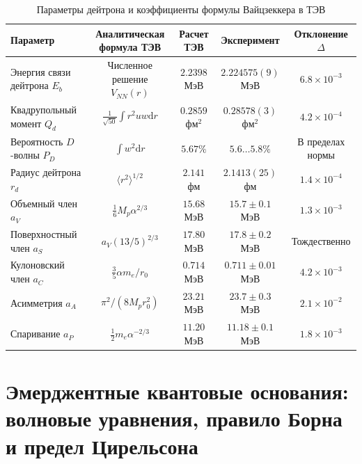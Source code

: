 \documentclass[12pt,a4paper]{article}
\theoremstyle{definition}
\theoremstyle{remark}
\begin{document}
\begin{table}[h!]
	\centering
	\small
	\caption{Параметры дейтрона и коэффициенты формулы Вайцзеккера в ТЭВ}
	\label{tab:nuclear}
	\vspace{2mm}
	\begin{tabular}{lcccc}
		\toprule
		\textbf{Параметр} & \textbf{Аналитическая формула ТЭВ} & \textbf{Расчет ТЭВ} & \textbf{Эксперимент} & \textbf{Отклонение $\Delta$} \\
		\midrule
		Энергия связи дейтрона $E_b$ & Численное решение $V_{NN}(r)$     & $2.2398$ МэВ        & $2.224575(9)$ МэВ    & $6.8 \times 10^{-3}$ \\
		Квадрупольный момент $Q_d$   & $\frac{1}{\sqrt{50}}\int r^2 u w \mathrm{d}r$ & $0.2859$ фм$^2$ & $0.28578(3)$ фм$^2$ & $4.2 \times 10^{-4}$ \\
		Вероятность $D$-волны $P_D$  & $\int w^2 \mathrm{d}r$             & $5.67\%$            & $5.6\dots 5.8\%$     & В пределах нормы \\
		Радиус дейтрона $r_d$        & $\langle r^2 \rangle^{1/2}$        & $2.141$ фм          & $2.1413(25)$ фм      & $1.4 \times 10^{-4}$ \\
		\midrule
		Объемный член $a_V$          & $\frac{1}{6} M_p \alpha^{2/3}$     & $15.68$ МэВ         & $15.7 \pm 0.1$ МэВ   & $1.3 \times 10^{-3}$ \\
		Поверхностный член $a_S$     & $a_V (13/5)^{2/3}$                 & $17.80$ МэВ         & $17.8 \pm 0.2$ МэВ   & Тождественно \\
		Кулоновский член $a_C$       & $\frac{3}{5}\alpha m_e / r_0$      & $0.714$ МэВ         & $0.711 \pm 0.01$ МэВ & $4.2 \times 10^{-3}$ \\
		Асимметрия $a_A$             & $\pi^2 / (8 M_p r_0^2)$            & $23.21$ МэВ         & $23.7 \pm 0.3$ МэВ   & $2.1 \times 10^{-2}$ \\
		Спаривание $a_P$             & $\frac{1}{2} m_e \alpha^{-2/3}$    & $11.20$ МэВ         & $11.18 \pm 0.1$ МэВ  & $1.8 \times 10^{-3}$ \\
		\bottomrule
	\end{tabular}
\end{table}


\section{Эмерджентные квантовые основания: волновые уравнения, правило Борна и предел Цирельсона}
\label{sec:quantum_foundations}
\end{document}
